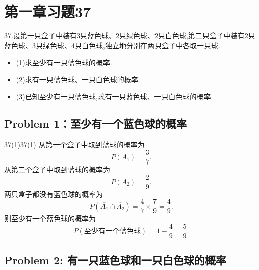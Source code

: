 \documentclass[twoside]{article}
\begin{document}
\maketitle
\vspace{-3.5em}

\tableofcontents

\section{第一章习题37}

37.设第一只盒子中装有3只蓝色球、2只绿色球、2只白色球,第二只盒子中装有2只
蓝色球、3只绿色球、4只白色球,独立地分别在两只盒子中各取一只球.

\begin{itemize}
    \item (1)求至少有一只蓝色球的概率.
    \item (2)求有一只蓝色球、一只白色球的概率.
    \item (3)已知至少有一只蓝色球,求有一只蓝色球、一只白色球的概率
\end{itemize}

\subsection*{Problem 1：至少有一个蓝色球的概率}

\begin{ans}{37(1)}{37(1)}
    从第一个盒子中取到蓝球的概率为
    \[
    P(A_1) = \frac{3}{7}.
    \]
    从第二个盒子中取到蓝球的概率为
    \[
    P(A_2) = \frac{2}{9}.
    \]
    两只盒子都没有蓝色球的概率为
    \[
    P(\overline{A_1} \cap \overline{A_2}) = \frac{4}{7} \times \frac{7}{9} = \frac{4}{9}.
    \]
    则至少有一个蓝色球的概率为
    \[
    P(\text{至少有一个蓝色球}) = 1 - \frac{4}{9} = \frac{5}{9}.
    \]
\end{ans}
    
\subsection*{Problem 2: 有一只蓝色球和一只白色球的概率}
    
\end{document}
